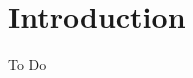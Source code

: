 \documentclass[journal,a4paper]{IEEEtran}
\begin{document}
\section{Introduction}
To Do
% 
% 
% 
% 




 





%
%
\end{document}
